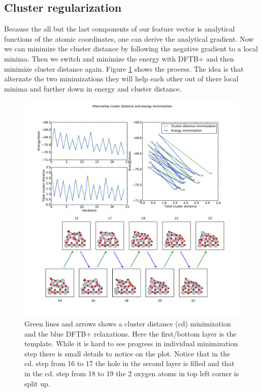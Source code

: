 \documentclass[%
 aps,
 prl,%
 amsmath,amssymb,
 reprint,%
]{revtex4-1}
\begin{document}
\subsection{Cluster regularization}

Because the all but the last components of our feature vector is analytical functions of the atomic coordinates, one can derive the analytical gradient. Now we can minimize the cluster distance by following the negative gradient to a local minima. Then we switch and minimize the energy with DFTB+ and then minimize cluster distance again. Figure \ref{fig_min} shows the process. The idea is that alternate the two minimizations they will help each other out of there local minima and further down in energy and cluster distance.
   
\begin{figure}[h]
    \centering
    \includegraphics[width=1.0\columnwidth]{acdminplot_74_98_ridgemin2_5_9_500_Ti13O26Ridge.pdf}
    \caption{Green lines and arrows shows a cluster distance (cd) minimization and the blue DFTB+ relaxations. Here the first/bottom layer is the template. While it is hard to see progress in individual minimization step there is small details to notice on the plot. Notice that in the cd. step from 16 to 17 the hole in the second layer is filled and that in the cd. step from 18 to 19 the 2 oxygen atoms in top left corner is split up.}
    \label{fig_min}
\end{figure}
\end{document}
